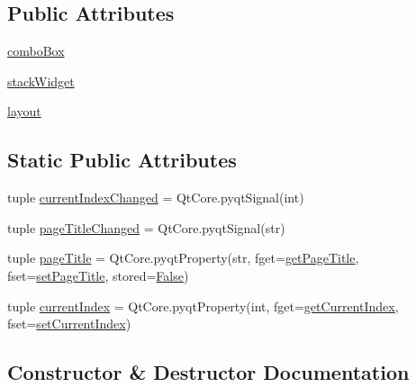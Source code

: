 \subsection*{Public Attributes}
\begin{DoxyCompactItemize}
\item 
\hyperlink{classmultipagewidget_1_1PyMultiPageWidget_af0a194564d00496f2a2e913dc7715c20}{combo\+Box}
\item 
\hyperlink{classmultipagewidget_1_1PyMultiPageWidget_a8373c4475e4cd3b6c2624fbd35cbfb1e}{stack\+Widget}
\item 
\hyperlink{classmultipagewidget_1_1PyMultiPageWidget_a06153c3b9f5097bb7063ea7c56673e2d}{layout}
\end{DoxyCompactItemize}
\subsection*{Static Public Attributes}
\begin{DoxyCompactItemize}
\item 
tuple \hyperlink{classmultipagewidget_1_1PyMultiPageWidget_a5682778ef6c8a66de57aa1b511606118}{current\+Index\+Changed} = Qt\+Core.\+pyqt\+Signal(int)
\item 
tuple \hyperlink{classmultipagewidget_1_1PyMultiPageWidget_a051f26314dede77f797a8bbfeeaa1814}{page\+Title\+Changed} = Qt\+Core.\+pyqt\+Signal(str)
\item 
tuple \hyperlink{classmultipagewidget_1_1PyMultiPageWidget_a49e3e9dafda5eb5afe9e84977adf7fff}{page\+Title} = Qt\+Core.\+pyqt\+Property(str, fget=\hyperlink{classmultipagewidget_1_1PyMultiPageWidget_a9fbecb04d0ed28f37c998339d56e99ab}{get\+Page\+Title}, fset=\hyperlink{classmultipagewidget_1_1PyMultiPageWidget_ae31194377f3226d2862368d7896a2ca1}{set\+Page\+Title}, stored=\hyperlink{libqhull_8h_a306ebd41c0cd1303b1372c6153f0caf8}{False})
\item 
tuple \hyperlink{classmultipagewidget_1_1PyMultiPageWidget_ae0b03917c29064d592c3814b2ac361e0}{current\+Index} = Qt\+Core.\+pyqt\+Property(int, fget=\hyperlink{classmultipagewidget_1_1PyMultiPageWidget_aac7bc792c5b8a91cf1a5e1564ed0f758}{get\+Current\+Index}, fset=\hyperlink{classmultipagewidget_1_1PyMultiPageWidget_a7eac1b9f4a5bbbaf9665b50407a12744}{set\+Current\+Index})
\end{DoxyCompactItemize}


\subsection{Constructor \& Destructor Documentation}
\hypertarget{classmultipagewidget_1_1PyMultiPageWidget_a40d7d74245e7f21ddd92e05d6257c4be}{}
